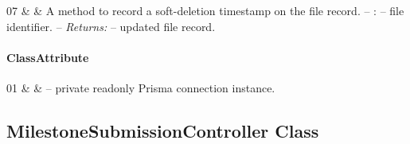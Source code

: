 \begin{ClassMethodTable}
07 &  &
A method to record a soft-deletion timestamp on the file record.
\newline -- :  -- file identifier.
\newline -- \textit{Returns:}  -- updated file record. \\ \hline
\end{ClassMethodTable}

\paragraph{ClassAttribute}
\begin{ClassAttributeTable}
01 &  &  -- private readonly Prisma connection instance. \\ \hline
\end{ClassAttributeTable}

\subsection{MilestoneSubmissionController Class}

